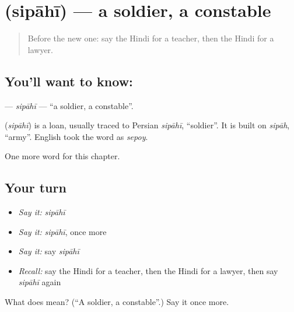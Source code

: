\section[\texorpdfstring{\hi{सिपाही} (sipāhī)}{सिपाही (sipāhī)}]{ (sipāhī) — a soldier, a constable}

\label{lesson:HI-C193-sipahi}



\begin{quote}
Before the new one: say the Hindi for a teacher, then the Hindi for a lawyer.
\end{quote}

\subsection*{You'll want to know: }
\textbf{} — \emph{sipāhī} — \textquotedblleft{}a soldier, a constable\textquotedblright{}.

\begin{cousinweb}
\textbf{} (\emph{sipāhī}) is a loan, usually traced to Persian \emph{sipāhī}, \textquotedblleft{}soldier\textquotedblright{}. It is built on \emph{sipāh}, \textquotedblleft{}army\textquotedblright{}. English took the word as \emph{sepoy}.
\end{cousinweb}

\begin{grammarlens}[title={What you've built}]
One more word for this chapter.
\end{grammarlens}

\subsection*{Your turn}
\begin{itemize}
\raggedright
  \item \emph{Say it:} \emph{sipāhī}
  \item \emph{Say it:} \emph{sipāhī}, once more
  \item \emph{Say it:} say \emph{sipāhī}
  \item \emph{Recall:} say the Hindi for a teacher, then the Hindi for a lawyer, then say \emph{sipāhī} again
\end{itemize}

\begin{tcolorbox}[breakable,colback=teal!4,colframe=teal!35!black,title={Before you move on}]
What does  mean? (\textquotedblleft{}A soldier, a constable\textquotedblright{}.) Say it once more.
\end{tcolorbox}
